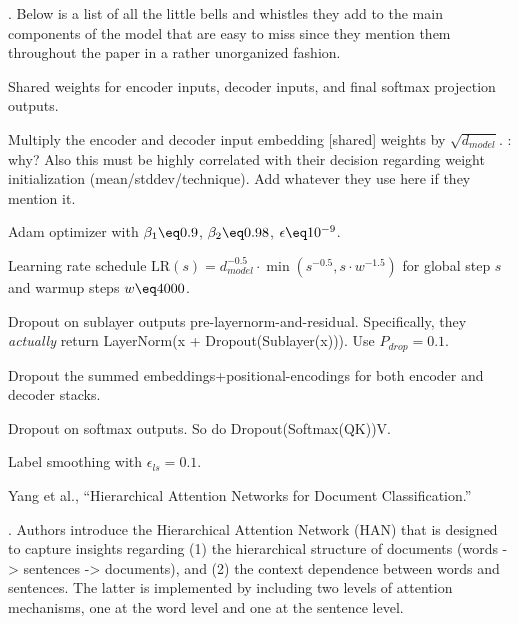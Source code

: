 \documentclass[11pt]{article}
\newcommand\myspace[1][]{\vspace{#1\bigskipamount}}
\newcommand\p{\Needspace{10\baselineskip} \noindent}
\newcommand\bluesec[1]{\myspace \p \blue{#1}}
\begin{document}
\bluesec{Summary of Add-ons}. Below is a list of all the little bells and whistles they add to the main components of the model that are easy to miss since they mention them throughout the paper in a rather unorganized fashion.
\begin{compactitem}
	\item Shared weights for encoder inputs, decoder inputs, and final softmax projection outputs. 
	\item Multiply the encoder and decoder input embedding [shared] weights by $\sqrt{d_{model}}$. : why? Also this must be highly correlated with their decision regarding weight initialization (mean/stddev/technique). Add whatever they use here if they mention it.
	
	\item Adam optimizer with $\beta_1 \eq 0.9$, $\beta_2 \eq 0.98$, $\epsilon \eq 10^{-9}$.
	
	\item Learning rate schedule $\text{LR}(s) = d^{-0.5}_{model} \cdot \min \left(  s^{-0.5}, s \cdot w^{-1.5}  \right)  $ for global step $s$ and warmup steps $w \eq 4000$. 
	
	\item Dropout on sublayer outputs pre-layernorm-and-residual. Specifically, they \textit{actually} return LayerNorm(x + Dropout(Sublayer(x))). Use $P_{drop} = 0.1$. 
	
	\item Dropout the summed embeddings+positional-encodings for both encoder and decoder stacks.
	
	\item Dropout on softmax outputs. So do Dropout(Softmax(QK))V. 
	
	\item Label smoothing with $\epsilon_{ls} = 0.1$. 
\end{compactitem}




\vspace{-1em}
{\footnotesize Yang et al., ``Hierarchical Attention Networks for Document Classification.''}

. Authors introduce the Hierarchical Attention Network (HAN) that is designed to capture insights regarding (1) the hierarchical structure of documents (words -> sentences -> documents), and (2) the context dependence between words and sentences. The latter is implemented by including two levels of attention mechanisms, one at the word level and one at the sentence level.
\end{document}
